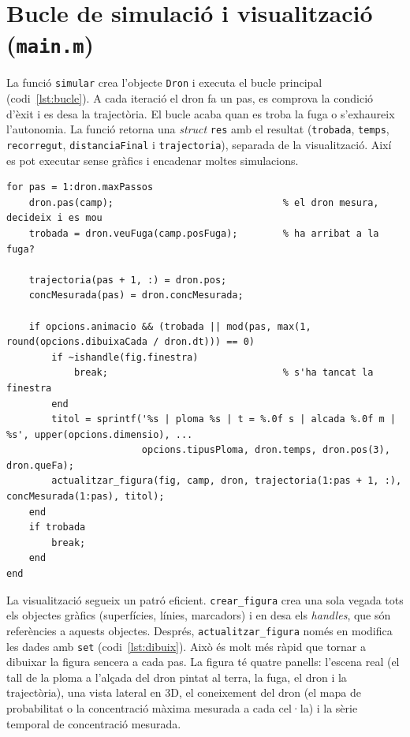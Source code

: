 \documentclass[11pt,a4paper]{article}
\begin{document}
\section{Bucle de simulació i visualització (\texttt{main.m})}

La funció \texttt{simular} crea l'objecte \texttt{Dron} i executa el bucle principal (codi~\ref{lst:bucle}). A cada iteració el dron fa un pas, es comprova la condició d'èxit i es desa la trajectòria. El bucle acaba quan es troba la fuga o s'exhaureix l'autonomia. La funció retorna una \emph{struct} \texttt{res} amb el resultat (\texttt{trobada}, \texttt{temps}, \texttt{recorregut}, \texttt{distanciaFinal} i \texttt{trajectoria}), separada de la visualització. Així es pot executar sense gràfics i encadenar moltes simulacions.

\begin{lstlisting}[caption={Bucle principal de \texttt{simular}.}, label=lst:bucle]
for pas = 1:dron.maxPassos
    dron.pas(camp);                              % el dron mesura, decideix i es mou
    trobada = dron.veuFuga(camp.posFuga);        % ha arribat a la fuga?

    trajectoria(pas + 1, :) = dron.pos;
    concMesurada(pas) = dron.concMesurada;

    if opcions.animacio && (trobada || mod(pas, max(1, round(opcions.dibuixaCada / dron.dt))) == 0)
        if ~ishandle(fig.finestra)
            break;                               % s'ha tancat la finestra
        end
        titol = sprintf('%s | ploma %s | t = %.0f s | alcada %.0f m | %s', upper(opcions.dimensio), ...
                        opcions.tipusPloma, dron.temps, dron.pos(3), dron.queFa);
        actualitzar_figura(fig, camp, dron, trajectoria(1:pas + 1, :), concMesurada(1:pas), titol);
    end
    if trobada
        break;
    end
end
\end{lstlisting}

La visualització segueix un patró eficient. \texttt{crear\_figura} crea una sola vegada tots els objectes gràfics (superfícies, línies, marcadors) i en desa els \emph{handles}, que són referències a aquests objectes. Després, \texttt{actualitzar\_figura} només en modifica les dades amb \texttt{set} (codi~\ref{lst:dibuix}). Això és molt més ràpid que tornar a dibuixar la figura sencera a cada pas. La figura té quatre panells: l'escena real (el tall de la ploma a l'alçada del dron pintat al terra, la fuga, el dron i la trajectòria), una vista lateral en 3D, el coneixement del dron (el mapa de probabilitat o la concentració màxima mesurada a cada cel·la) i la sèrie temporal de concentració mesurada.
\end{document}
